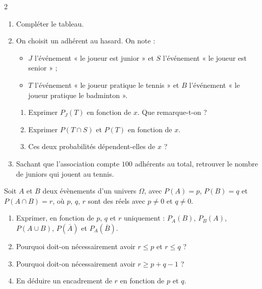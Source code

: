 \documentclass[10pt,a4paper]{article}
\begin{document}
\begin{multicols}{2}
\begin{exo}
\begin{enumerate}[leftmargin=*]
    \item Compléter le tableau.
    \item On choisit un adhérent au hasard. On note :
    \begin{itemize}
        \item \(J\) l'événement « le joueur est junior » et \(S\) l'événement « le joueur est senior » ;
        \item \(T\) l'événement « le joueur pratique le tennis » et \(B\) l'événement « le joueur pratique le badminton ».
    \end{itemize}
    \begin{enumerate}
        \item Exprimer \(P_J(T)\) en fonction de \(x\). Que remarque-t-on ?
        \item Exprimer \(P(T \cap S)\) et \(P(T)\) en fonction de \(x\).
        \item Ces deux probabilités dépendent-elles de \(x\) ?
    \end{enumerate}
    \item Sachant que l'association compte \(100\) adhérents au total, retrouver le nombre de juniors qui jouent au tennis.
\end{enumerate}
\end{exo}


\begin{exo}
Soit \(A\) et \(B\) deux évènements d'un univers \(\Omega\), avec \(P(A)=p\), \(P(B)=q\) et \(P(A\cap B)=r\), où \(p\), \(q\), \(r\) sont des réels avec \(p\neq0\) et \(q\neq0\).

\begin{enumerate}[leftmargin=*]
    \item Exprimer, en fonction de \(p\), \(q\) et \(r\) uniquement : \(P_A(B)\), \(P_B(A)\), \(P(A\cup B)\), \(P(\overline A)\) et \(P_A(\overline B)\).
    \item Pourquoi doit-on nécessairement avoir \(r\leqslant p\) et \(r\leqslant q\) ?
    \item Pourquoi doit-on nécessairement avoir \(r \geqslant p+q-1\) ?
    \item En déduire un encadrement de \(r\) en fonction de \(p\) et \(q\).
\end{enumerate}
\end{exo}


\end{multicols}
\end{document}
